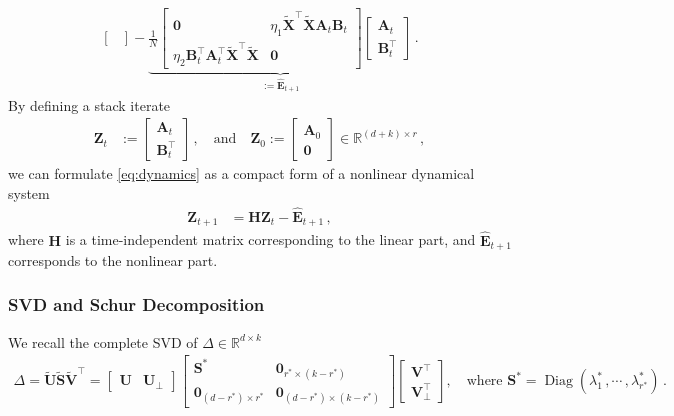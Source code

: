 \begin{equation}
\begin{split}
\begin{bmatrix}
    \end{bmatrix} - \underbrace{\frac{1}{N} \begin{bmatrix}
        \bm 0 & \eta_1 \widetilde{\bm X}^{\!\top}\widetilde{\bm X}\bm A_t \bm B_t\\
        \eta_2 \bm B_t^{\!\top} \bm A_t^{\!\top}\widetilde{\bm X}^{\!\top}\widetilde{\bm X} & \bm 0
    \end{bmatrix}\begin{bmatrix}
        \bm A_t \\ \bm B_t^{\!\top}
    \end{bmatrix}}_{:=\widehat{\bm E}_{t+1}}\, .     
    \end{split}
\end{equation}
By defining a stack iterate
\begin{align}
    \bm Z_t & := \begin{bmatrix}
        \bm A_t \\ \bm B_t^{\!\top}
    \end{bmatrix}\, , \quad \mbox{and} \quad \bm Z_0 := \begin{bmatrix}
        \bm A_0 \\ \bm 0
    \end{bmatrix}\in \mathbb{R}^{(d+k)\times r}\, , \label{stack-Z}
\end{align}
we can formulate \cref{eq:dynamics} as a compact form of a nonlinear dynamical system  
\begin{align}\label{eq:nonlineardy}
    \bm Z_{t+1} & = \bm H \bm Z_t - \widehat{\bm E}_{t+1}\,,
\end{align}
where $\bm H$ is a time-independent matrix corresponding to the linear part, and $\widehat{\bm E}_{t+1}$ corresponds to the nonlinear part.

\subsubsection{SVD and Schur Decomposition}
\label{app:svd}

We recall the complete SVD of $\Delta \in \mathbb{R}^{d \times k}$ 
\begin{align*}
\Delta=\widetilde{\bm U} \widetilde{\bm S} \widetilde{\bm V}^{\!\top}=
    \begin{bmatrix}
        \bm U & \bm U_\perp
    \end{bmatrix}\begin{bmatrix}
       \bm S^* & \bm 0_{r^*\times (k-r^*)}\\
        \bm 0_{(d-r^*)\times r^*} & \bm 0_{(d-r^*)\times (k-r^*)}
    \end{bmatrix}\begin{bmatrix}
        \bm V^{\!\top} \\ \bm V_\perp^{\!\top}
    \end{bmatrix},\quad \text{where }\bm S^* = \operatorname{Diag}\left(\lambda_1^*\,, \cdots \,,\lambda_{r^*}^*\right)\,.
\end{align*}

